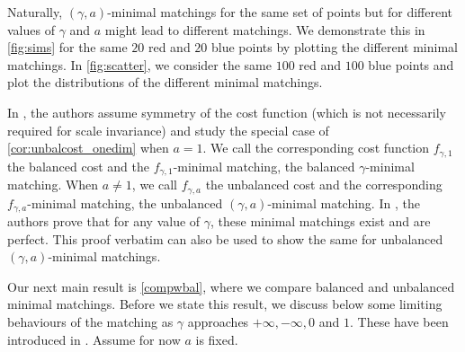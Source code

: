 \documentclass{article}
\newcommand{\note}{\textcolor{red}}
\begin{document}
Naturally, $(\gamma,a)$-minimal matchings for the same set of points
but for different values of $\gamma$ and $a$ might lead to different
matchings. We demonstrate this in \cref{fig:sims} for the same $20$
red and $20$ blue points by plotting the different minimal matchings.  In \cref{fig:scatter}, we
consider the same $100$ red and $100$ blue points and plot the
distributions of the different minimal matchings.%

In \cite{minimal}, the authors assume symmetry of the cost function
(which is not necessarily required for scale invariance) and study the
special case of \cref{cor:unbalcost_onedim} when $a=1$. We call the
corresponding cost function $f_{\gamma,1}$ the balanced
cost and the $f_{\gamma,1}$-minimal matching, the balanced $\gamma$-minimal
matching. When $a\neq 1$, we call $f_{\gamma,a}$ the unbalanced cost
and the corresponding $f_{\gamma,a}$-minimal matching, the unbalanced
$(\gamma,a)$-minimal matching. In \cite[Theorem 1]{minimal}, the
authors prove that for any value of $\gamma$, these minimal matchings
exist and are perfect. This proof verbatim can also be used to show
the same for unbalanced $(\gamma,a)$-minimal matchings.



  Our next main result is \cref{compwbal}, where we compare balanced
  and unbalanced minimal matchings.  Before we state this result, we
  discuss below some limiting behaviours
of the matching as $\gamma$ approaches $+\infty,-\infty, 0 $ and $1$. These
have been introduced in \cite{minimal}. Assume for now $a$ is fixed.
\end{document}
